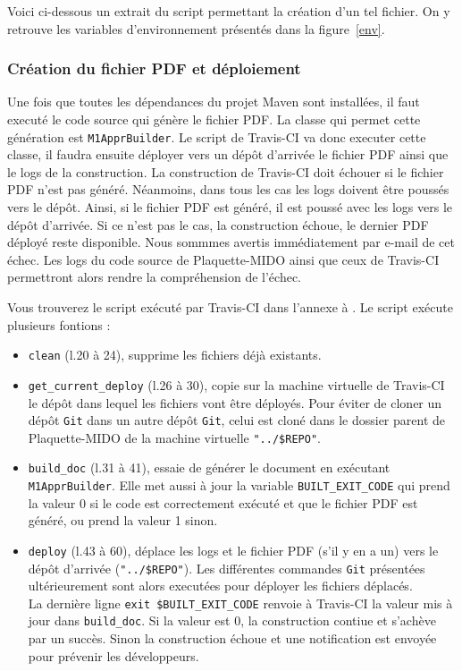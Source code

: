 Voici ci-dessous un extrait du script permettant la création d'un tel fichier. On y retrouve les variables d'environnement présentés dans la figure~\ref{env}.



\subsubsection*{Création du fichier PDF et déploiement}
Une fois que toutes les dépendances du projet Maven sont installées, il faut executé le code source qui génère le fichier PDF. La classe qui permet cette génération est \texttt{M1ApprBuilder}. Le script de Travis-CI va donc executer cette classe, il faudra ensuite déployer vers un dépôt d'arrivée le fichier PDF ainsi que le logs de la construction. La construction de Travis-CI doit échouer si le fichier PDF n'est pas généré. Néanmoins, dans tous les cas les logs doivent être poussés vers le dépôt. Ainsi, si le fichier PDF est généré, il est poussé avec les logs vers le dépôt d'arrivée. Si ce n'est pas le cas, la construction échoue, le dernier PDF déployé reste disponible. Nous sommmes avertis immédiatement par e-mail de cet échec. Les logs du code source de Plaquette-MIDO ainsi que ceux de Travis-CI permettront alors rendre la compréhension de l'échec.

Vous trouverez le script exécuté par Travis-CI dans l'annexe à . Le script exécute plusieurs fontions :

\begin{itemize}
    \item \texttt{clean} (l.20 à 24), supprime les fichiers déjà existants.
    \item \texttt{get\_current\_deploy} (l.26 à 30), copie sur la machine virtuelle de Travis-CI le dépôt dans lequel les fichiers vont être déployés. Pour éviter de cloner un dépôt \texttt{Git} dans un autre dépôt \texttt{Git}, celui est cloné dans le dossier parent de Plaquette-MIDO de la machine virtuelle \texttt{"../\${REPO}"}.
    \item \texttt{build\_doc} (l.31 à 41), essaie de générer le document en exécutant \texttt{M1ApprBuilder}. Elle met aussi à jour la variable \texttt{BUILT\_EXIT\_CODE} qui prend la valeur 0 si le code est correctement exécuté et que le fichier PDF est généré, ou prend la valeur 1 sinon.
    \item \texttt{deploy} (l.43 à 60), déplace les logs et le fichier PDF (s'il y en a un) vers le dépôt d'arrivée (\texttt{"../\${REPO}"}). Les différentes commandes \texttt{Git} présentées ultérieurement sont alors executées pour déployer les fichiers déplacés.\\ La dernière ligne \texttt{exit \${BUILT\_EXIT\_CODE}} renvoie à Travis-CI la valeur mis à jour dans \texttt{build\_doc}. Si la valeur est 0, la construction contiue et s'achève par un succès. Sinon la construction échoue et une notification est envoyée pour prévenir les développeurs.
\end{itemize}


